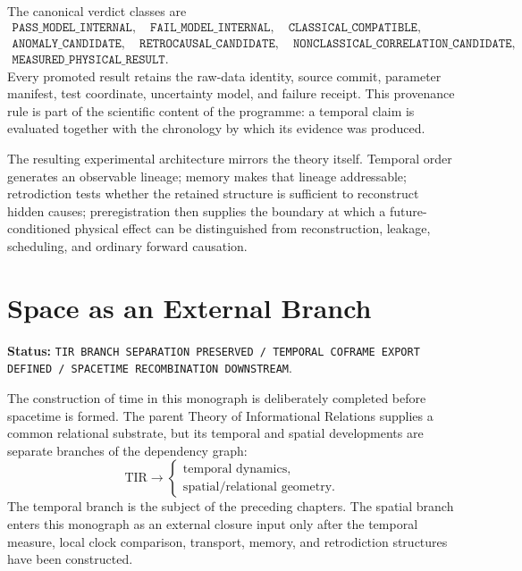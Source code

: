 The canonical verdict classes are
\[
\begin{gathered}
\texttt{PASS\_MODEL\_INTERNAL},\quad
\texttt{FAIL\_MODEL\_INTERNAL},\quad
\texttt{CLASSICAL\_COMPATIBLE},\\
\texttt{ANOMALY\_CANDIDATE},\quad
\texttt{RETROCAUSAL\_CANDIDATE},\quad
\texttt{NONCLASSICAL\_CORRELATION\_CANDIDATE},\\
\texttt{MEASURED\_PHYSICAL\_RESULT}.
\end{gathered}
\]
Every promoted result retains the raw-data identity, source commit, parameter manifest, test coordinate, uncertainty model, and failure receipt. This provenance rule is part of the scientific content of the programme: a temporal claim is evaluated together with the chronology by which its evidence was produced.

The resulting experimental architecture mirrors the theory itself. Temporal order generates an observable lineage; memory makes that lineage addressable; retrodiction tests whether the retained structure is sufficient to reconstruct hidden causes; preregistration then supplies the boundary at which a future-conditioned physical effect can be distinguished from reconstruction, leakage, scheduling, and ordinary forward causation.


\chapter{Space as an External Branch}

\noindent\textbf{Status:} \texttt{TIR BRANCH SEPARATION PRESERVED / TEMPORAL COFRAME EXPORT DEFINED / SPACETIME RECOMBINATION DOWNSTREAM}.

The construction of time in this monograph is deliberately completed before spacetime is formed. The parent Theory of Informational Relations supplies a common relational substrate, but its temporal and spatial developments are separate branches of the dependency graph:
\[
\boxed{
\mathrm{TIR}
\longrightarrow
\begin{cases}
\text{temporal dynamics},\\
\text{spatial/relational geometry}.
\end{cases}}
\]
The temporal branch is the subject of the preceding chapters. The spatial branch enters this monograph as an external closure input only after the temporal measure, local clock comparison, transport, memory, and retrodiction structures have been constructed.

